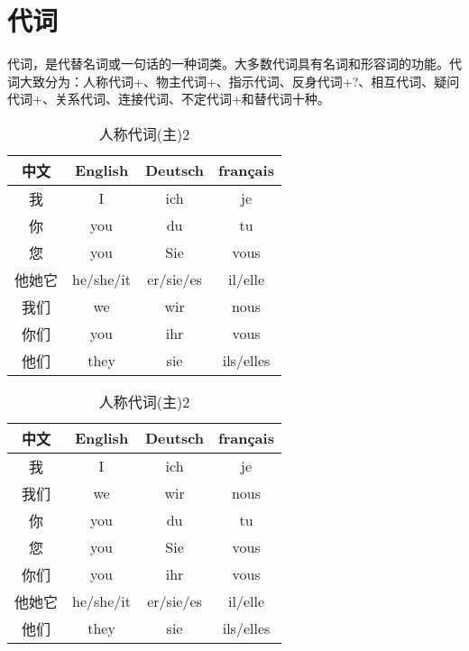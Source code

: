 \documentclass[12pt,A4paper,oneside,reqno]{amsart}
\numberwithin{equation}{section}
\theoremstyle{plain}
\theoremstyle{plain}
\theoremstyle{plain}
\numberwithin{equation}{section}
\theoremstyle{remark}
\begin{document}
\section{代词}
代词，是代替名词或一句话的一种词类。大多数代词具有名词和形容词的功能。代词大致分为：人称代词+、物主代词+、指示代词、反身代词+?、相互代词、疑问代词+、关系代词、连接代词、不定代词+和替代词十种。
\begin{table}[th]
\begin{minipage}[t]{0.48\textwidth}
		\centering
	\begin{tabular}{c|c|c|c}
		\hline									
中文	&	English	&	Deutsch	&	français	\\
\hline							
我	&	I	&	ich	&	je	\\
你	&	you	&	du	&	tu	\\
您	&	you	&	Sie	&	vous	\\
他她它	&	he/she/it	&	er/sie/es	&	il/elle	\\
我们	&	we	&	wir	&	nous	\\
你们	&	you	&	ihr	&	vous	\\
他们	&	they	&	sie	&	ils/elles	\\


		\hline									
		
	\end{tabular}
	\vspace{0.5cm}
	\caption{人称代词(主)}
	\label{fig:prep}
\end{minipage}
\begin{minipage}[t]{0.48\textwidth}
	\centering
	\begin{tabular}{c|c|c|c}
		\hline									
		中文	&	English	&	Deutsch	&	français	\\
		\hline
		我	&	I	&	ich	&	je	\\
		我们	&	we	&	wir	&	nous	\\
		你	&	you	&	du	&	tu	\\
		您	&	you	&	Sie	&	vous	\\
		你们	&	you	&	ihr	&	vous	\\
		他她它	&	he/she/it	&	er/sie/es	&	il/elle	\\
		他们	&	they	&	sie	&	ils/elles	\\
		
		\hline									
		
	\end{tabular}
	\vspace{0.5cm}
	\caption{人称代词(主)2}
	\label{fig:prep2}
\end{minipage}
\end{table}
\end{document}
